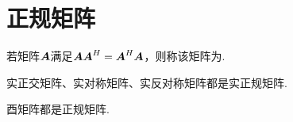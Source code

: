 \section{正规矩阵}
\begin{definition}
若矩阵\(\boldsymbol{A}\)满足\(\boldsymbol{A}\boldsymbol{A}^H = \boldsymbol{A}^H\boldsymbol{A}\)，则称该矩阵为.
\end{definition}

\begin{property}
实正交矩阵、实对称矩阵、实反对称矩阵都是实正规矩阵.
\end{property}

\begin{property}
酉矩阵都是正规矩阵.
\end{property}

